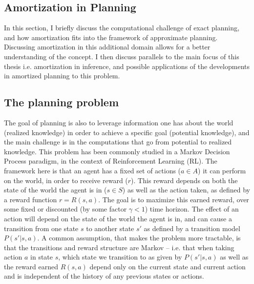 

\subsection{Amortization in Planning}

In this section, I briefly discuss the computational challenge of exact planning, and how amortization fits into the framework of approximate planning. Discussing amortization in this additional domain allows for a better understanding of the concept. I then discuss parallels to the main focus of this thesis i.e. amortization in inference, and possible applications of the developments in amortized planning to this problem.

\subsection*{The planning problem}

The goal of planning is also to leverage information one has about the world (realized knowledge) in order to achieve a specific goal (potential knowledge), and the main challenge is in the computations that go from potential to realized knowledge. This problem has been commonly studied in a Markov Decision Process paradigm, in the context of Reinforcement Learning (RL). The framework here is that an agent has a fixed set of actions ($a \in A$) it can perform on the world, in order to receive reward ($r$). This reward depends on both the state of the world the agent is in ($s \in S$) as well as the action taken, as defined by a reward function $r = R(s, a)$. The goal is to maximize this earned reward, over some fixed or discounted (by some factor $\gamma < 1$) time horizon. The effect of an action will depend on the state of the world the agent is in, and can cause a transition from one state $s$ to another state $s'$ as defined by a transition model $P(s' | s, a)$. A common assumption, that makes the problem more tractable, is that the transitions and reward structure are Markov -- i.e. that when taking action $a$ in state $s$, which state we transition to as given by $P(s' | s, a)$ as well as the reward earned $R(s,a)$ depend only on the current state and current action and is independent of the history of any previous states or actions.


